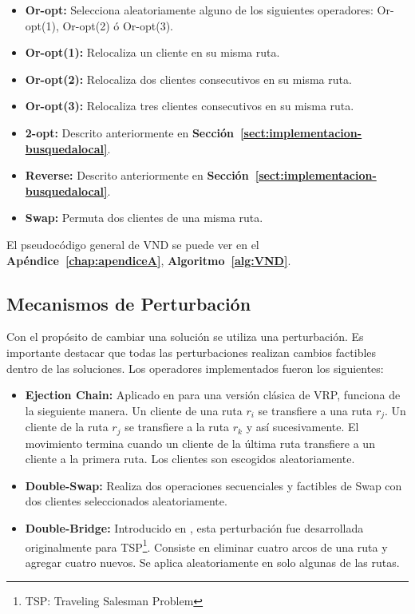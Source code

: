 \begin{itemize}
\item \textbf{Or-opt:} Selecciona aleatoriamente alguno de los siguientes operadores: Or-opt(1), Or-opt(2) ó Or-opt(3).
\item \textbf{Or-opt(1):} Relocaliza un cliente en su misma ruta.
\item \textbf{Or-opt(2):} Relocaliza dos clientes consecutivos en su misma ruta.
\item \textbf{Or-opt(3):} Relocaliza tres clientes consecutivos en su misma ruta.
\item \textbf{2-opt: } Descrito anteriormente en \textbf{Sección~\ref{sect:implementacion-busquedalocal}}.
\item \textbf{Reverse: } Descrito anteriormente en \textbf{Sección~\ref{sect:implementacion-busquedalocal}}.
\item \textbf{Swap: } Permuta dos clientes de una misma ruta.
\end{itemize}

El pseudocódigo general de VND se puede ver en el \textbf{Apéndice~\ref{chap:apendiceA}}, \textbf{Algoritmo~\ref{alg:VND}}.

\subsection{Mecanismos de Perturbación}
\label{sect:perturbacion}

Con el propósito de cambiar una solución se utiliza una perturbación. Es importante destacar que todas las per\-tur\-ba\-cio\-nes realizan cambios factibles dentro de las soluciones. Los operadores implementados fueron los siguientes:\\

\begin{itemize}
\item \textbf{Ejection Chain:} Aplicado en  \cite{PertEC} para una versión clásica de VRP, funciona de la sieguiente manera. Un cliente de una ruta $r_i$ se transfiere a una ruta $r_j$. Un cliente de la ruta $r_j$ se transfiere a la ruta $r_k$ y así sucesivamente. El movimiento termina cuando un cliente de la última ruta transfiere a un cliente a la primera ruta. Los clientes son escogidos aleatoriamente.

\item \textbf{Double-Swap:} Realiza dos operaciones secuenciales y factibles de Swap con dos clientes seleccionados alea\-to\-ria\-men\-te. 

\item \textbf{Double-Bridge:} Introducido en \cite{PertDB}, esta perturbación fue desarrollada originalmente para TSP\footnote{TSP: Traveling Salesman Problem}. Con\-sis\-te en eliminar cuatro arcos de una ruta y agregar cuatro nuevos. Se aplica aleatoriamente en solo algunas de las rutas.
\end{itemize}


